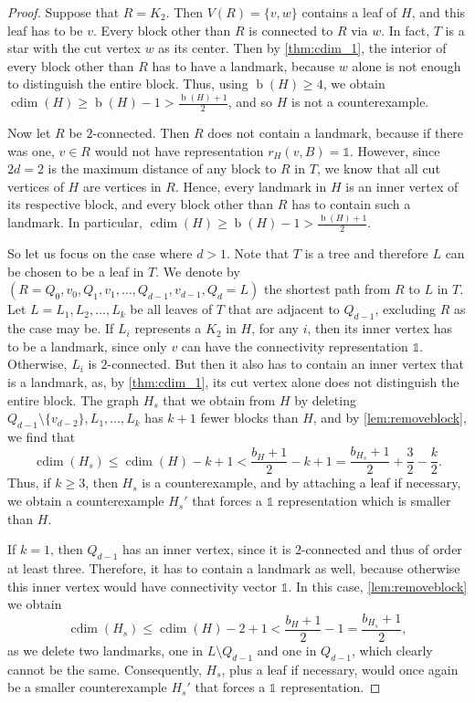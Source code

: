 \documentclass[letterpaper,12pt,headings=normal,parskip=half]{scrartcl}
\DeclareMathOperator{\cdim}{cdim}
\DeclareMathOperator{\blocks}{\text{$b$}}
\theoremstyle{definition}
\begin{document}
\begin{proof}
    Suppose that $R=K_2$.
    Then $V(R)=\{v,w\}$ contains a leaf of $H$, and this leaf has to be $v$.
    Every block other than $R$ is connected to $R$ via $w$. 
    In fact, $T$ is a star with the cut vertex $w$ as its center.
    Then by \cref{thm:cdim_1}, the interior of every block other than $R$ has to have a landmark, because $w$ alone is not enough to distinguish the entire block. 
    Thus, using $\blocks(H)\geq4$, we obtain $\cdim(H)\geq\blocks(H)-1>\frac{\blocks(H)+1}{2}$, and so $H$ is not a counterexample.
    
    Now let $R$ be \mbox{$2$-connected}.
    Then $R$ does not contain a landmark, because if there was one, $v\in R$ would not have representation $r_H(v,B)=\mathds{1}$.
    However, since $2d=2$ is the maximum distance of any block to $R$ in $T$, we know that all cut vertices of $H$ are vertices in $R$. 
    Hence, every landmark in $H$ is an inner vertex of its respective block, and every block other than $R$ has to contain such a landmark.
    In particular, $\cdim(H)\geq\blocks(H)-1>\frac{\blocks(H)+1}{2}$.

    So let us focus on the case where $d>1$.
    Note that $T$ is a tree and therefore $L$ can be chosen to be a leaf in $T$. 
    We denote by $(R=Q_0,v_0,Q_1,v_1,\ldots,Q_{d-1},v_{d-1},Q_{d}=L)$ the shortest path from $R$ to $L$ in $T$.
    Let $L=L_1,L_2,\ldots,L_k$ be all leaves of $T$ that are adjacent to $Q_{d-1}$, excluding $R$ as the case may be.
    If $L_i$ represents a $K_2$ in $H$, for any $i$, then its inner vertex has to be a landmark, since only $v$ can have the connectivity representation $\mathds{1}$.
    Otherwise, $L_i$ is \mbox{$2$-connected}. 
    But then it also has to contain an inner vertex that is a landmark, as, by \cref{thm:cdim_1}, its cut vertex alone does not distinguish the entire block.
    The graph $H_s$ that we obtain from $H$ by deleting $Q_{d-1}\setminus\{v_{d-2}\},L_1,\ldots,L_k$ has $k+1$ fewer blocks than $H$, and by \cref{lem:removeblock}, we find that
    \begin{equation*}
        \cdim(H_s)\leq \cdim(H)-k+1<\frac{b_H+1}{2}-k+1=\frac{b_{H_s}+1}{2}+\frac{3}{2}-\frac{k}{2}.
    \end{equation*}
    Thus, if $k\geq3$, then $H_s$ is a counterexample, and by attaching a leaf if necessary, we obtain a counterexample $H_s'$ that forces a $\mathds{1}$ representation which is smaller than $H$.
    
    If $k=1$, then $Q_{d-1}$ has an inner vertex, since it is \mbox{$2$-connected} and thus of order at least three.
    Therefore, it has to contain a landmark as well, because otherwise this inner vertex would have connectivity vector $\mathds{1}$.
    In this case, \cref{lem:removeblock} we obtain
    \begin{equation*}
        \cdim(H_s)\leq\cdim(H)-2+1<\frac{b_H+1}{2}-1=\frac{b_{H_s}+1}{2},
    \end{equation*}
    as we delete two landmarks, one in $L\setminus Q_{d-1}$ and one in $Q_{d-1}$, which clearly cannot be the same. Consequently, $H_s$, plus a leaf if necessary, would once again be a smaller counterexample $H_s'$ that forces a $\mathds{1}$ representation.


\end{proof}
\end{document}
